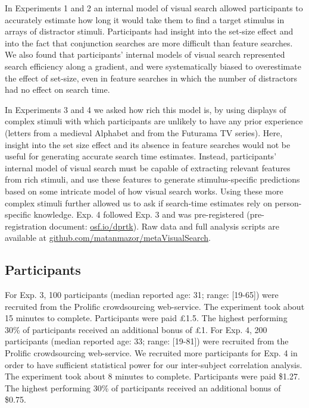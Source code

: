 \documentclass[12pt,twoside]{reedthesis}
\begin{document}
In Experiments 1 and 2 an internal model of visual search allowed participants to accurately estimate how long it would take them to find a target stimulus in arrays of distractor stimuli. Participants had insight into the set-size effect and into the fact that conjunction searches are more difficult than feature searches. We also found that participants' internal models of visual search represented search efficiency along a gradient, and were systematically biased to overestimate the effect of set-size, even in feature searches in which the number of distractors had no effect on search time.

In Experiments 3 and 4 we asked how rich this model is, by using displays of complex stimuli with which participants are unlikely to have any prior experience (letters from a medieval Alphabet and from the Futurama TV series). Here, insight into the set size effect and its absence in feature searches would not be useful for generating accurate search time estimates. Instead, participants' internal model of visual search must be capable of extracting relevant features from rich stimuli, and use these features to generate stimulus-specific predictions based on some intricate model of how visual search works. Using these more complex stimuli further allowed us to ask if search-time estimates rely on person-specific knowledge. Exp. 4 followed Exp. 3 and was pre-registered (pre-registration document: \url{osf.io/dprtk}). Raw data and full analysis scripts are available at \url{github.com/matanmazor/metaVisualSearch}.

\hypertarget{participants-3}{%
\subsection{Participants}\label{participants-3}}

For Exp. 3, 100 participants (median reported age: 31; range: {[}19-65{]}) were recruited from the Prolific crowdsourcing web-service. The experiment took about 15
minutes to complete. Participants were paid £1.5. The highest performing 30\% of participants received an additional bonus of £1. For Exp. 4, 200 participants (median reported age: 33; range: {[}19-81{]}) were recruited from the Prolific crowdsourcing web-service. We recruited more participants for Exp. 4 in order to have sufficient statistical power for our inter-subject correlation analysis. The experiment took about 8 minutes to complete. Participants were paid \$1.27. The highest performing 30\% of participants received an additional bonus of \$0.75.
\end{document}
